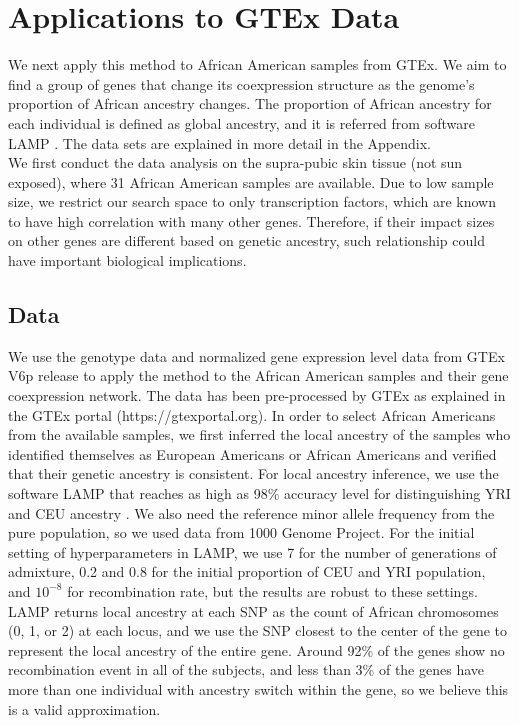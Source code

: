 \documentclass[aoas,preprint]{imsart}
\numberwithin{equation}{section}
\theoremstyle{plain}
\begin{document}
\section{Applications to GTEx Data} \label{applications}
We next apply this method to African American samples from GTEx. We aim to find a group of genes that change its coexpression structure as the genome's proportion of African ancestry changes. The proportion of African ancestry for each individual is defined as global ancestry, and it is referred from software LAMP \cite{pacsaniuc2009imputation}. The data sets are explained in more detail in the Appendix.\\

 We first conduct the data analysis on the supra-pubic skin tissue (not sun exposed), where 31 African American samples are available. Due to low sample size, we restrict our search space to only transcription factors, which are known to have high correlation with many other genes. Therefore, if their impact sizes on other genes are different based on genetic ancestry, such relationship could have important biological implications. \\

\subsection{Data}
 We use the genotype data and normalized gene expression level data from GTEx V6p release \cite{lonsdale2013genotype} to apply the method to the African American samples and their gene coexpression network. The data has been pre-processed by GTEx as explained in the GTEx portal (https://gtexportal.org). In order to select African Americans from the available samples, we first inferred the local ancestry of the samples who identified themselves as European Americans or African Americans and verified that their genetic ancestry is consistent. For local ancestry inference, we use the software LAMP that reaches as high as 98\% accuracy level for distinguishing YRI and CEU ancestry \cite{pacsaniuc2009imputation}. We also need the reference minor allele frequency from the pure population, so we used data from 1000 Genome Project. For the initial setting of hyperparameters in LAMP, we use 7 for the number of generations of admixture, 0.2 and 0.8 for the initial proportion of CEU and YRI population, and $10^{-8}$ for recombination rate, but the results are robust to these settings. LAMP returns local ancestry at each SNP as the count of African chromosomes (0, 1, or 2) at each locus, and we use the SNP closest to the center of the gene to represent the local ancestry of the entire gene.  Around 92\% of the genes show no recombination event in all of the subjects, and less than 3\% of the genes have more than one individual with ancestry switch within the gene, so we believe this is a valid approximation. \\
\end{document}
